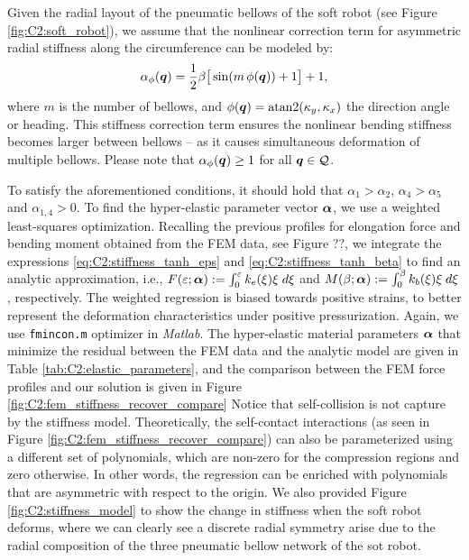 %
\begin{asm}
Given the radial layout of the pneumatic bellows of the soft robot (see Figure \ref{fig:C2:soft_robot}), we assume that the nonlinear correction term for asymmetric radial stiffness along the circumference can be modeled by:
%
\begin{equation}
\alpha_\phi ({\boldsymbol{q}}) = \frac{1}{2}\beta \big[\sin( m \,\phi({\boldsymbol{q}})) + 1 \big] + 1,
\end{equation}
%
where $m$ is the number of bellows, and $\phi({\boldsymbol{q}}) = \text{atan2}(\kappa_y,\kappa_x)$ the direction angle or heading. This stiffness correction term ensures the nonlinear bending stiffness becomes larger between bellows -- as it causes simultaneous deformation of multiple bellows. Please note that $\alpha_\phi({\boldsymbol{q}}) \ge 1$ for all ${\boldsymbol{q}} \in \mathcal{Q}$.
\end{asm}

To satisfy the aforementioned conditions, it should hold that $\alpha_1 > \alpha_2 $, $\alpha_4 > \alpha_5$ and $\alpha_{1,4} > 0$.  To find the hyper-elastic parameter vector ${\boldsymbol{\alpha}}$, we use a weighted least-squares optimization. Recalling the previous profiles for elongation force and bending moment obtained from the FEM data, see Figure ??, we integrate the expressions \eqref{eq:C2:stiffness_tanh_eps} and \eqref{eq:C2:stiffness_tanh_beta} to find an analytic approximation, i.e., $F(\varepsilon; {\boldsymbol{\alpha}}):= \int_0^\varepsilon k_e(\xi) \xi \; d\xi$ and $M(\beta; {\boldsymbol{\alpha}}):= \int_0^\beta k_b(\xi) \xi \; d\xi$, respectively. The weighted regression is biased towards positive strains, to better represent the deformation characteristics under positive pressurization. Again, we use \texttt{fmincon.m} optimizer in \textit{Matlab}. The hyper-elastic material parameters ${\boldsymbol{\alpha}}$ that minimize the residual between the FEM data and the analytic model are given in Table \ref{tab:C2:elastic_parameters}, and the comparison between the FEM force profiles and our solution is given in Figure \ref{fig:C2:fem_stiffness_recover_compare} Notice that self-collision is not capture by the stiffness model. Theoretically, the self-contact interactions (as seen in Figure \ref{fig:C2:fem_stiffness_recover_compare}) can also be parameterized using a different set of polynomials, which are non-zero for the compression regions and zero otherwise. In other words, the regression can be enriched with polynomials that are asymmetric with respect to the origin. We also provided Figure \ref{fig:C2:stiffness_model} to show the change in stiffness when the soft robot deforms, where we can clearly see a discrete radial symmetry arise due to the radial composition of the three pneumatic bellow network of the sot robot. 



